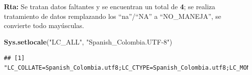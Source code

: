 \documentclass[
]{article}
\newenvironment{Shaded}{\begin{snugshade}}{\end{snugshade}}
\newcommand{\AttributeTok}[1]{\textcolor[rgb]{0.13,0.29,0.53}{#1}}
\newcommand{\CommentTok}[1]{\textcolor[rgb]{0.56,0.35,0.01}{\textit{#1}}}
\newcommand{\FunctionTok}[1]{\textcolor[rgb]{0.13,0.29,0.53}{\textbf{#1}}}
\newcommand{\NormalTok}[1]{#1}
\newcommand{\OtherTok}[1]{\textcolor[rgb]{0.56,0.35,0.01}{#1}}
\newcommand{\SpecialCharTok}[1]{\textcolor[rgb]{0.81,0.36,0.00}{\textbf{#1}}}
\newcommand{\StringTok}[1]{\textcolor[rgb]{0.31,0.60,0.02}{#1}}
\begin{document}
\begin{Shaded}
\end{Shaded}

\textbf{Rta:} Se tratan datos faltantes y se encuentran un total de
\textbf{4}; se realiza tratamiento de datos remplazando los
``na''/``NA'' a ``NO\_MANEJA'', se convierte todo mayúsculas.

\begin{Shaded}
\begin{Highlighting}[]
 \FunctionTok{Sys.setlocale}\NormalTok{(}\StringTok{"LC\_ALL"}\NormalTok{, }\StringTok{"Spanish\_Colombia.UTF{-}8"}\NormalTok{)}
\end{Highlighting}
\end{Shaded}

\begin{verbatim}
## [1] "LC_COLLATE=Spanish_Colombia.utf8;LC_CTYPE=Spanish_Colombia.utf8;LC_MONETARY=Spanish_Colombia.utf8;LC_NUMERIC=C;LC_TIME=Spanish_Colombia.utf8"
\end{verbatim}
\end{document}
